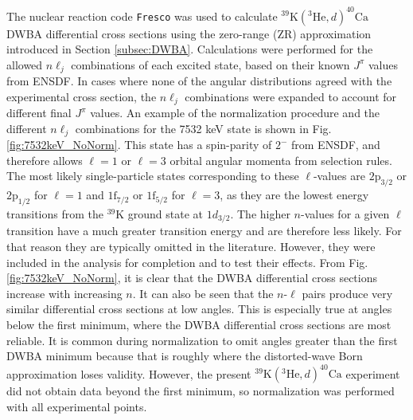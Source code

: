 The nuclear reaction code \texttt{Fresco} \cite{Thompson1988,Fresco} was used to calculate $^{39}\mathrm{K}(^{3}\mathrm{He},d)^{40}\mathrm{Ca}$ DWBA differential cross sections using the zero-range (ZR) approximation introduced in Section \ref{subsec:DWBA}. Calculations were performed for the allowed $n\ell_{j}$ combinations of each excited state, based on their known $J^{\pi}$ values from ENSDF. In cases where none of the angular distributions agreed with the experimental cross section, the $n\ell_{j}$ combinations were expanded to account for different final $J^{\pi}$ values. An example of the normalization procedure and the different $n\ell_{j}$ combinations for the 7532 keV state is shown in Fig. \ref{fig:7532keV_NoNorm}. This state has a spin-parity of $2^{-}$ from ENSDF, and therefore allows $\ell=1$ or $\ell=3$ orbital angular momenta from selection rules. The most likely single-particle states corresponding to these $\ell$-values are $2\mathrm{p}_{3/2}$ or $2\mathrm{p}_{1/2}$ for $\ell=1$ and $1\mathrm{f}_{7/2}$ or $1\mathrm{f}_{5/2}$ for $\ell=3$, as they are the lowest energy transitions from the $^{39}$K ground state at $1d_{3/2}$. The higher $n$-values for a given $\ell$ transition have a much greater transition energy and are therefore less likely. For that reason they are typically omitted in the literature. However, they were included in the analysis for completion and to test their effects. From Fig. \ref{fig:7532keV_NoNorm}, it is clear that the DWBA differential cross sections increase with increasing $n$. It can also be seen that the $n$-$\ell$ pairs produce very similar differential cross sections at low angles. This is especially true at angles below the first minimum, where the DWBA differential cross sections are most reliable. It is common during normalization to omit angles greater than the first DWBA minimum because that is roughly where the distorted-wave Born approximation loses validity. However, the present $^{39}\mathrm{K}(^{3}\mathrm{He}, d)^{40}\mathrm{Ca}$ experiment did not obtain data beyond the first minimum, so normalization was performed with all experimental points.

